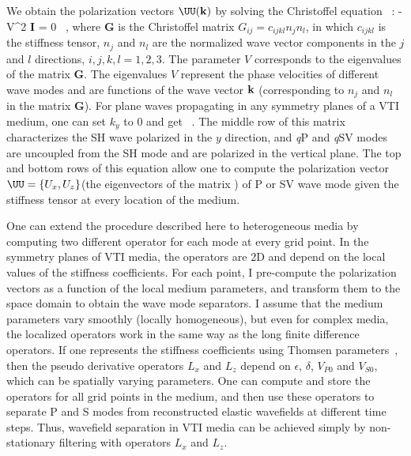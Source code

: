 We obtain the polarization vectors $\UU(\kk)$ by solving the
Christoffel equation ~\cite[]{akirichards.2002,Tsvankin}:
\beq\label{3dChristoffel}
 - \rho V^2 {\bf I} \rb \UU = 0 \, ,
\eeq
where {\textbf G} is the Christoffel matrix $G_{ij}=c_{ijkl}n_jn_l$,
in which $c_{ijkl}$ is the stiffness tensor, $n_j$ and $n_l$ are the
normalized wave vector components in the $j$ and $l$ directions,
$i,j,k,l=1,2,3$. The parameter $V$ corresponds to the eigenvalues of
the matrix {\textbf G}. The eigenvalues $V$ represent the phase
velocities of different wave modes and are functions of the wave vector
${\mathbf k}$ (corresponding to $n_j$ and $n_l$ in the matrix {\textbf G}).
{For plane waves propagating in any symmetry planes of a VTI medium, 
one can set $k_y$ to $0$ and get}
\def\c11{c_{11}}
\def\c55{c_{55}}
\def\c13{c_{13}}
\def\c33{c_{33}}
\beq\label{VtiChristoffel}
\lb 
\rb
\lb{}  \, .
\eeq
{The middle row of this matrix characterizes the SH wave 
polarized in the $y$ direction, and {\it q}P and {\it q}SV modes are
uncoupled from the SH mode and are polarized in the vertical
plane. The top and bottom rows of this equation} 
allow one to compute  the polarization vector
{$\UU=\{U_x,U_z\}$}(the eigenvectors of the 
matrix ) of {P or SV} wave mode
given the stiffness tensor at every location of the medium.

One can extend the procedure described here to heterogeneous media by
computing two different operator for each mode at every grid point. In the symmetry
planes of VTI media, the operators are 2D and depend on the local
values of the stiffness coefficients. For each point, I pre-compute
the polarization vectors as a function of the local medium parameters,
and transform them to the space domain to obtain the wave mode
separators. {I assume that the medium parameters vary smoothly
(locally homogeneous), but even for complex media, the localized
operators work in the same way as the long finite difference operators.}
If one represents the stiffness coefficients using Thomsen
parameters~\cite[]{GEO51-10-19541966}, then the pseudo derivative
operators $L_x$ and $L_z$ depend on $\epsilon$, $\delta$, $V_{P0}$ and
$V_{S0}$, which {can be} spatially varying
parameters. One can compute and store the operators for all grid points
in the medium, and then use these operators to separate P and S modes
from reconstructed elastic wavefields at different time steps.  Thus,
wavefield separation in VTI media can be achieved simply by
non-stationary filtering with operators $L_x$ and $L_z$.

